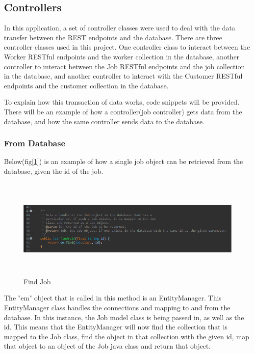 \subsection{Controllers}
\label{sec:SystemDesignControllers}

In this application, a set of controller classes were used to deal with the data transfer between the REST endpoints and the database.  There are three controller classes used in this project. One controller class to interact between the Worker RESTful endpoints and the worker collection in the database, another controller to interact between the Job RESTful endpoints and the job collection in the database, and another controller to interact with the Customer RESTful endpoints and the customer collection in the database.

\bigskip

To explain how this transaction of data works, code snippets will be provided. There will be an example of how a controller(job controller) gets data from the database, and how the same controller sends data to the database.



\subsubsection{From Database}
\label{sec:SystemDesignDatabase}

Below(fig[\ref{fig:findJob}]) is an example of how a single job object can be retrieved from the database, given the id of the job.

\begin{figure}[H]
    \centering
    \includegraphics[width=\textwidth, height=140pt]{DesignImages/JobGetData.PNG}
    \caption{Find Job}
    \label{fig:findJob}
\end{figure}

\bigskip

The "em" object that is called in this method is an EntityManager. This EntityManager class handles the connections and mapping to and from the database. In this instance, the Job model class is being passed in, as well as the id. This means that the EntityManager will now find the collection that is mapped to the Job class, find the object in that collection with the given id, map that object to an object of the Job java class and return that object.

